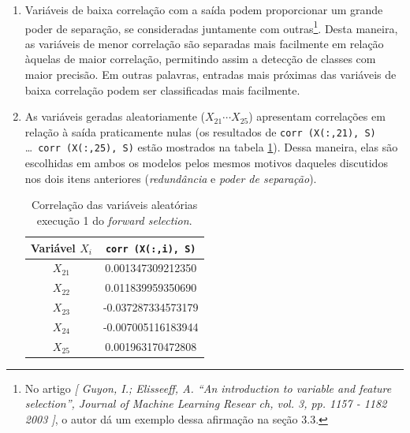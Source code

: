 \begin{enumerate}
\begin{enumerate}
		\item Variáveis de baixa correlação com a saída podem proporcionar um grande poder
		de separação, se consideradas juntamente com outras\footnote{No artigo \textit {[ Guyon,  I.;  Elisseeff,  A.
		“An  introduction  to  variable  and feature selection”, Journal of Machine
		Learning Resear ch, vol. 3, pp. 1157 - 1182 2003 ]}, o autor dá um exemplo dessa
		afirmação na seção 3.3.}. Desta maneira, as variáveis de menor correlação são
		separadas mais facilmente em relação àquelas de maior correlação, permitindo
		assim a detecção de classes com maior precisão. Em outras palavras, entradas
		mais próximas das variáveis de baixa correlação podem ser classificadas mais
		facilmente.

		 \item As variáveis geradas aleatoriamente (\( X_{21} \cdots X_{25} \))
		 apresentam correlações em relação à saída praticamente nulas (os resultados
		 de \texttt{corr (X(:,21), S)} \ldots  ~\texttt{corr (X(:,25), S)} estão
		 mostrados na tabela \ref{tab:corr.aleat.}). Dessa maneira, elas são
		 escolhidas em ambos os modelos pelos mesmos motivos daqueles discutidos nos
		 dois itens anteriores (\textit{redundância} e \textit{poder de separação}).
		 
		 \begin{table}[H]
				    \centering
					\caption{\label{tab:corr.aleat.} Correlação das variáveis
					aleatórias execução 1 do \textit{forward selection}.}
					\begin{tabular}{| c | c |}
					
					\hline
					Variável \(X_i \) & \texttt{corr (X(:,i), S)} \\ \hline \hline
					\(X_{21}\) & 0.001347309212350 \\ \hline
					\(X_{22}\) & 0.011839959350690 \\ \hline
					\(X_{23}\) & -0.037287334573179 \\ \hline
					\(X_{24}\) & -0.007005116183944 \\ \hline
					\(X_{25}\) & 0.001963170472808 \\ \hline
					
					
					\end{tabular}	    
			    \end{table}  	
	
			    \FloatBarrier
		 
		\end{enumerate}
		

\end{enumerate}
